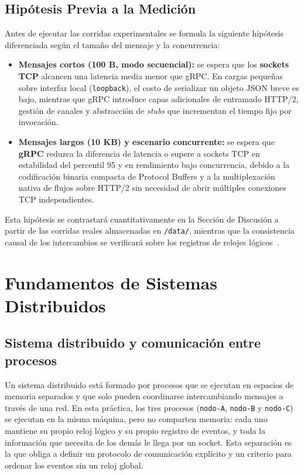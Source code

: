 \documentclass[12pt,a4paper]{article}
\begin{document}
\subsection{Hipótesis Previa a la Medición}
Antes de ejecutar las corridas experimentales se formula la siguiente hipótesis diferenciada según el tamaño del mensaje y la concurrencia:
\begin{itemize}
  \item \textbf{Mensajes cortos (100 B, modo secuencial):} se espera que los \textbf{sockets TCP} alcancen una latencia media menor que gRPC. En cargas pequeñas sobre interfaz local (\texttt{loopback}), el costo de serializar un objeto JSON breve es bajo, mientras que gRPC introduce capas adicionales de entramado HTTP/2, gestión de canales y abstracción de \emph{stubs} que incrementan el tiempo fijo por invocación.
  \item \textbf{Mensajes largos (10 KB) y escenario concurrente:} se espera que \textbf{gRPC} reduzca la diferencia de latencia o supere a sockets TCP en estabilidad del percentil 95 y en rendimiento bajo concurrencia, debido a la codificación binaria compacta de Protocol Buffers y a la multiplexación nativa de flujos sobre HTTP/2 sin necesidad de abrir múltiples conexiones TCP independientes.
\end{itemize}
Esta hipótesis se contrastará cuantitativamente en la Sección de Discusión a partir de las corridas reales almacenadas en \texttt{/data/}, mientras que la consistencia causal de los intercambios se verificará sobre los registros de relojes lógicos~\cite{castello2024inductive,mathur2022treeclock}.

\section{Fundamentos de Sistemas Distribuidos}
\label{sec:fundamento_sd}

\subsection{Sistema distribuido y comunicación entre procesos}

Un sistema distribuido está formado por procesos que se ejecutan en espacios de memoria separados y que solo pueden coordinarse intercambiando mensajes a través de una red. En esta práctica, los tres procesos (\texttt{nodo-A}, \texttt{nodo-B} y \texttt{nodo-C}) se ejecutan en la misma máquina, pero no comparten memoria: cada uno mantiene su propio reloj lógico y su propio registro de eventos, y toda la información que necesita de los demás le llega por un socket. Esta separación es la que obliga a definir un protocolo de comunicación explícito y un criterio para ordenar los eventos sin un reloj global.
\end{document}
